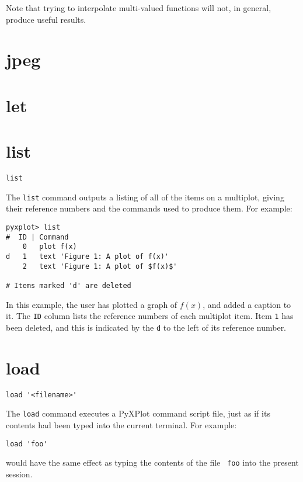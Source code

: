 Note that trying to interpolate multi-valued functions will not, in general,
produce useful results.


\section{jpeg}


\section{let}


\section{list}

\begin{verbatim}
list
\end{verbatim}

The {\tt list} command outputs a listing of all of the items on a multiplot,
giving their reference numbers and the commands used to produce them. For
example:

\begin{verbatim}
pyxplot> list
#  ID | Command
    0   plot f(x)
d   1   text 'Figure 1: A plot of f(x)'
    2   text 'Figure 1: A plot of $f(x)$'

# Items marked 'd' are deleted
\end{verbatim}

In this example, the user has plotted a graph of $f(x)$, and added a caption to
it. The {\tt ID} column lists the reference numbers of each multiplot item.
Item {\tt 1} has been deleted, and this is indicated by the {\tt d} to the left
of its reference number.


\section{load}

\begin{verbatim}
load '<filename>'
\end{verbatim}

The {\tt load} command executes a PyXPlot command script file, just as if its
contents had been typed into the current terminal. For example:

\begin{verbatim}
load 'foo'
\end{verbatim}

\noindent would have the same effect as typing the contents of the file {\tt
foo} into the present session.

